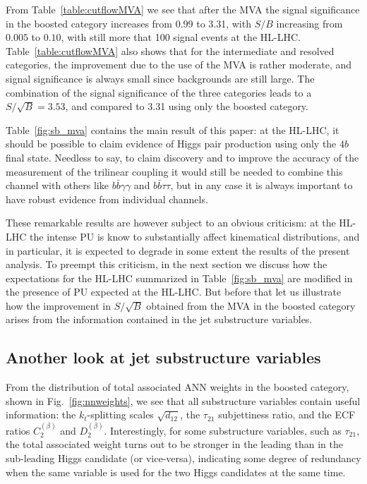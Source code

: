 From Table~\ref{table:cutflowMVA} we see that after the
MVA the signal significance in the boosted category increases
from 0.99 to 3.31, with $S/B$ increasing from $0.005$ to $0.10$,
with still more that 100 signal events at the HL-LHC.
%
Table~\ref{table:cutflowMVA} also shows that for the intermediate
and resolved categories, the improvement due to the use
of the MVA is rather moderate, and signal significance is always
small since backgrounds are still  large.
%
The combination of the signal significance of the
three categories leads to a $S/\sqrt{B}=3.53$, and compared
to 3.31 using only the boosted category.


Table~\ref{fig:sb_mva} contains the main result of this paper:
at the HL-LHC, it should be possible to claim evidence of
Higgs pair production using only the $4b$ final state.
%
Needless to say, to claim discovery and to improve the accuracy
of the measurement of the trilinear coupling it would still
be needed to combine this channel with others like
$b\bar{b}\gamma\gamma$ and $b\bar{b}\tau\tau$, but in any case
it is always important to have robust evidence from
individual channels.

These remarkable results are however subject to an obvious criticism:
at the HL-LHC the intense PU is know to substantially affect
kinematical distributions, and in particular, it is expected to degrade
in some extent the results of the present analysis.
%
To preempt this criticism, in the next section
we discuss how the expectations for the HL-LHC
summarized in  Table~\ref{fig:sb_mva} are modified in the presence
of PU expected at the HL-LHC.
%
But before that let us illustrate how the improvement in $S/\sqrt{B}$
obtained from the MVA in the boosted
category arises from the information contained in the
jet substructure variables.

\subsection{Another look at jet substructure variables}

%
From the distribution of total associated ANN weights in the
boosted category, shown in Fig.~\ref{fig:nnweights}, we see that
all substructure variables contain useful information:
the $k_t$-splitting scales $\sqrt{d_{12}}$,
the $\tau_{21}$ subjettiness ratio, and the ECF ratios
$C_2^{(\beta)}$ and $D_2^{(\beta)}$.
%
Interestingly, for some substructure variables, such as $\tau_{21}$,
the total associated weight turns out to be stronger in the leading
than in the sub-leading Higgs candidate (or vice-versa), indicating some
degree of redundancy when the same variable is used for the two Higgs candidates
at the same time.


